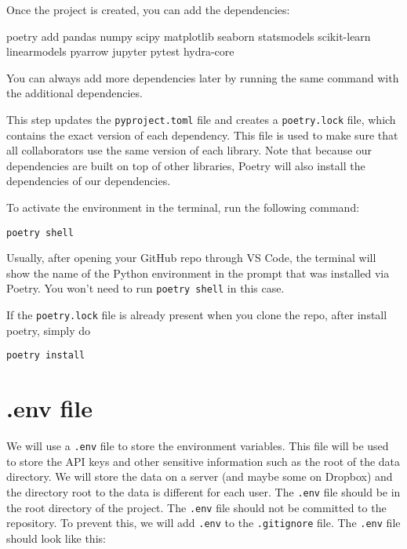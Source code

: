 \documentclass[
  letterpaper,
  DIV=11,
  numbers=noendperiod]{scrartcl}
\newenvironment{Shaded}{\begin{snugshade}}{\end{snugshade}}
\newcommand{\NormalTok}[1]{\textcolor[rgb]{0.00,0.23,0.31}{#1}}
\newcommand{\OperatorTok}[1]{\textcolor[rgb]{0.37,0.37,0.37}{#1}}
\begin{document}
Once the project is created, you can add the dependencies:

\begin{Shaded}
\begin{Highlighting}[]
\NormalTok{poetry add pandas numpy scipy matplotlib seaborn statsmodels scikit}\OperatorTok{{-}}\NormalTok{learn linearmodels pyarrow jupyter pytest hydra}\OperatorTok{{-}}\NormalTok{core}
\end{Highlighting}
\end{Shaded}

You can always add more dependencies later by running the same command
with the additional dependencies.

This step updates the \texttt{pyproject.toml} file and creates a
\texttt{poetry.lock} file, which contains the exact version of each
dependency. This file is used to make sure that all collaborators use
the same version of each library. Note that because our dependencies are
built on top of other libraries, Poetry will also install the
dependencies of our dependencies.

To activate the environment in the terminal, run the following command:

\texttt{poetry\ shell}

Usually, after opening your GitHub repo through VS Code, the terminal
will show the name of the Python environment in the prompt that was
installed via Poetry. You won't need to run \texttt{poetry\ shell} in
this case.

If the \texttt{poetry.lock} file is already present when you clone the
repo, after install poetry, simply do

\texttt{poetry\ install}

\hypertarget{env-file}{%
\section{.env file}\label{env-file}}

We will use a \texttt{.env} file to store the environment variables.
This file will be used to store the API keys and other sensitive
information such as the root of the data directory. We will store the
data on a server (and maybe some on Dropbox) and the directory root to
the data is different for each user. The \texttt{.env} file should be in
the root directory of the project. The \texttt{.env} file should not be
committed to the repository. To prevent this, we will add \texttt{.env}
to the \texttt{.gitignore} file. The \texttt{.env} file should look like
this:
\end{document}
